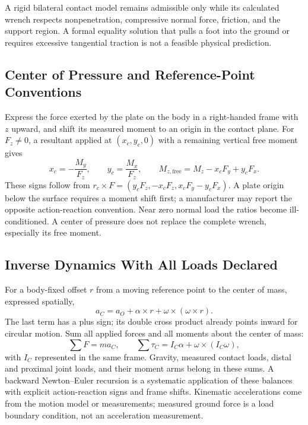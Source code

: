 A rigid bilateral contact model remains admissible only while its calculated wrench respects nonpenetration, compressive normal force, friction, and the support region. A formal equality solution that pulls a foot into the ground or requires excessive tangential traction is not a feasible physical prediction.

\subsection{Center of Pressure and Reference-Point Conventions}

Express the force exerted by the plate on the body in a right-handed frame with $z$ upward, and shift its measured moment to an origin in the contact plane. For $F_z\ne0$, a resultant applied at $(x_c,y_c,0)$ with a remaining vertical free moment gives
\begin{equation}
 x_c=-\frac{M_y}{F_z},\qquad y_c=\frac{M_x}{F_z},\qquad
 M_{z,\mathrm{free}}=M_z-x_cF_y+y_cF_x.
\end{equation}
These signs follow from $r_c\times F=(y_cF_z,-x_cF_z,x_cF_y-y_cF_x)$. A plate origin below the surface requires a moment shift first; a manufacturer may report the opposite action-reaction convention. Near zero normal load the ratios become ill-conditioned. A center of pressure does not replace the complete wrench, especially its free moment.

\subsection{Inverse Dynamics With All Loads Declared}

For a body-fixed offset $r$ from a moving reference point to the center of mass, expressed spatially,
\begin{equation}
 a_C=a_O+\alpha\times r+\omega\times(\omega\times r).
\end{equation}
The last term has a plus sign; its double cross product already points inward for circular motion. Sum all applied forces and all moments about the center of mass:
\begin{equation}
 \sum F=m a_C,\qquad \sum\tau_C=I_C\alpha+\omega\times(I_C\omega),
\end{equation}
with $I_C$ represented in the same frame. Gravity, measured contact loads, distal and proximal joint loads, and their moment arms belong in these sums. A backward Newton--Euler recursion is a systematic application of these balances with explicit action-reaction signs and frame shifts. Kinematic accelerations come from the motion model or measurements; measured ground force is a load boundary condition, not an acceleration measurement.

